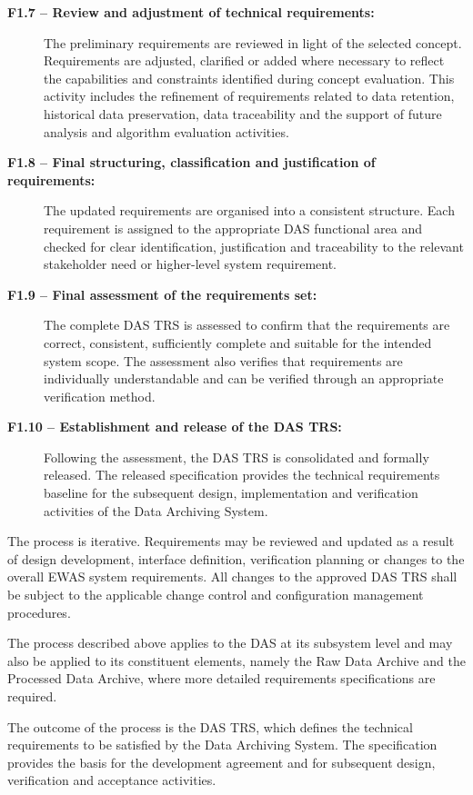 \begin{description}
    \item[\textbf{F1.7 -- Review and adjustment of technical requirements:}] The preliminary requirements are reviewed in light of the selected concept. Requirements are adjusted, clarified or added where necessary to reflect the capabilities and constraints identified during concept evaluation. This activity includes the refinement of requirements related to data retention, historical data preservation, data traceability and the support of future analysis and algorithm evaluation activities.
    \item[\textbf{F1.8 -- Final structuring, classification and justification of requirements:}] The updated requirements are organised into a consistent structure. Each requirement is assigned to the appropriate DAS functional area and checked for clear identification, justification and traceability to the relevant stakeholder need or higher-level system requirement.
    \item[\textbf{F1.9 -- Final assessment of the requirements set:}] The complete DAS TRS is assessed to confirm that the requirements are correct, consistent, sufficiently complete and suitable for the intended system scope. The assessment also verifies that requirements are individually understandable and can be verified through an appropriate verification method.
    \item[\textbf{F1.10 -- Establishment and release of the DAS TRS:}] Following the assessment, the DAS TRS is consolidated and formally released. The released specification provides the technical requirements baseline for the subsequent design, implementation and verification activities of the Data Archiving System.
\end{description}

The process is iterative. Requirements may be reviewed and updated as a result of design development, interface definition, verification planning or changes to the overall EWAS system requirements. All changes to the approved DAS TRS shall be subject to the applicable change control and configuration management procedures.

The process described above applies to the DAS at its subsystem level and may also be applied to its constituent elements, namely the Raw Data Archive and the Processed Data Archive, where more detailed requirements specifications are required.

The outcome of the process is the DAS TRS, which defines the technical requirements to be satisfied by the Data Archiving System. The specification provides the basis for the development agreement and for subsequent design, verification and acceptance activities.
